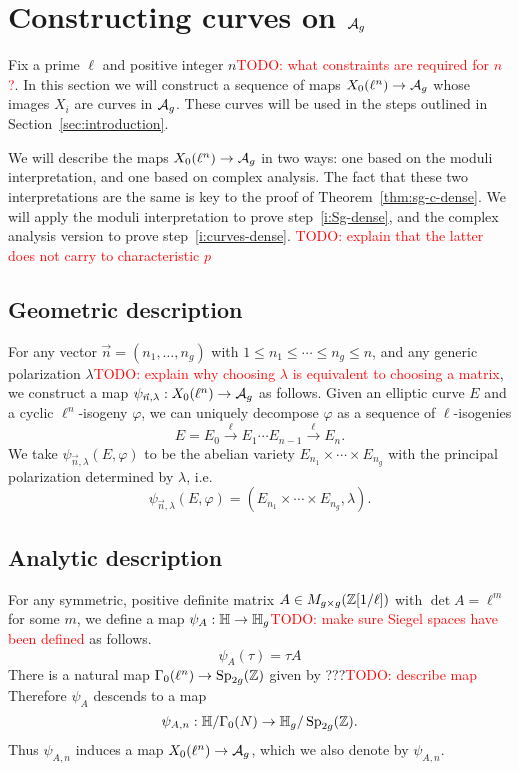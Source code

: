 \documentclass{amsart}
\begin{document}
\section{Constructing curves on $\mathcal{A}_g$}
\label{sec:curves-on-Ag}

Fix a prime $\ell$ and positive integer $n$\textcolor{red}{TODO: what constraints are required for $n$?}. In this section we will construct a sequence of maps $X_0(\ell^n) \to \mathcal{A}_g$ whose images $X_i$ are curves in $\mathcal{A}_g$. These curves will be used in the steps outlined in Section~\ref{sec:introduction}.

We will describe the maps $X_0(\ell^n) \to \mathcal{A}_g$ in two ways: one based on the moduli interpretation, and one based on complex analysis. The fact that these two interpretations are the same is key to the proof of Theorem~\ref{thm:sg-c-dense}. We will apply the moduli interpretation to prove step~\ref{i:Sg-dense}, and the complex analysis version to prove step~\ref{i:curves-dense}. \textcolor{red}{TODO: explain that the latter does not carry to characteristic $p$}

\subsection{Geometric description}
\label{sec:geo-desc}

For any vector $\vec{n} = (n_1,\dots,n_g)$ with $1 \leq n_1 \leq \cdots \leq n_g \leq n$, and any generic polarization $\lambda$\textcolor{red}{TODO: explain why choosing $\lambda$ is equivalent to choosing a matrix}, we construct a map $\psi_{\vec{n},\lambda}: X_0(\ell^n) \to \mathcal{A}_g$ as follows. Given an elliptic curve $E$ and a cyclic $\ell^n$-isogeny $\varphi$, we can uniquely decompose $\varphi$ as a sequence of $\ell$-isogenies
\[
  E = E_0 \xrightarrow{\ell} E_1 \cdots E_{n-1} \xrightarrow{\ell} E_n.
\]
We take $\psi_{\vec{n},\lambda}(E,\varphi)$ to be the abelian variety $E_{n_1} \times \cdots \times E_{n_g}$ with the principal polarization determined by $\lambda$, i.e.
\begin{equation}\label{def:psi-n-lambda}
  \psi_{\vec{n},\lambda}(E,\varphi) = (E_{n_1} \times \cdots \times E_{n_g}, \lambda).
\end{equation}

\subsection{Analytic description}
\label{sec:ana-desc}

For any symmetric, positive definite matrix $A \in M_{g \times g}(\mathbb{Z}[1/\ell])$ with $\det A = \ell^m$ for some $m$, we define a map $\psi_A: \mathbb{H} \to \mathbb{H}_g$\textcolor{red}{TODO: make sure Siegel spaces have been defined} as follows.
\[
  \psi_A(\tau) = \tau A
\]
There is a natural map $\Gamma_0(\ell^n) \to \operatorname{Sp}_{2g}(\mathbb{Z})$ given by ???\textcolor{red}{TODO: describe map}
Therefore $\psi_A$ descends to a map
\begin{equation}\label{def:psi-A-n}
  \psi_{A,n}: \mathbb{H}/\Gamma_0(N) \to \mathbb{H}_g/\operatorname{Sp}_{2g}(\mathbb{Z}).
\end{equation}
Thus $\psi_{A,n}$ induces a map $X_0(\ell^n) \to \mathcal{A}_g$, which we also denote by $\psi_{A,n}$.
\end{document}
